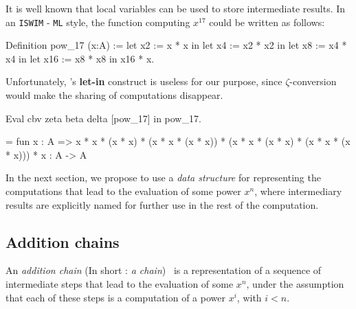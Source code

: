 It is well known that local variables can be used to store intermediate results.
In an \texttt{ISWIM} - \texttt{ML} style, the function computing $x^{17}$ could be written as follows:

\begin{Coqsrc}
Definition pow_17  (x:A) :=
  let x2 := x * x in
  let x4 := x2 * x2 in
  let x8 := x4 * x4 in
  let x16 := x8 * x8 in
  x16 * x.
\end{Coqsrc}
\label{pow-17-let-in}

Unfortunately, \coq's \textbf{let-in} construct is useless for our purpose, since $\zeta$-conversion 
would make the sharing of computations disappear.

\begin{Coqsrc}
Eval cbv  zeta beta delta [pow_17]  in  pow_17.
\end{Coqsrc}

\begin{Coqanswer}
 = fun x : A =>
       x * x * (x * x) * (x * x * (x * x)) *
       (x * x * (x * x) * (x * x * (x * x))) * x
     : A -> A 
\end{Coqanswer}
                                                                                                                                                                                                                                                                                                                                                                                                                                                                                                                                                                                                                                                                                                                                                                                                                                   
In the next section, we propose to use a \emph{data structure} for representing 
the computations that lead to the evaluation of some power $x^n$, where
intermediary results are explicitly named for further use in the rest of the computation.




\subsection{Addition chains}
An \emph{addition chain} (In short : \emph{a chain})~\cite{brauer1939} is a representation of a sequence of
intermediate steps that lead to the evaluation of some $x^n$, under the 
assumption that each of these steps is a computation of  a power $x^i$, with 
$i<n$.

